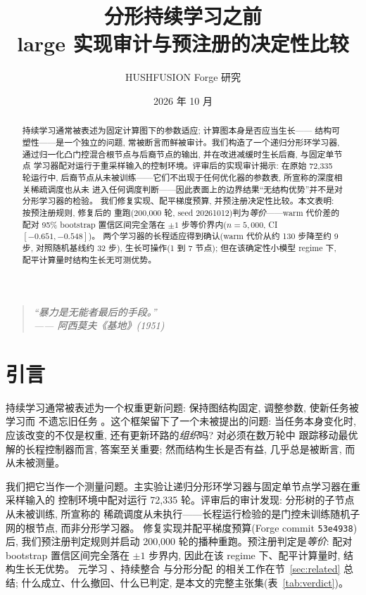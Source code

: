 \documentclass[11pt]{article}
\title{分形持续学习之前\\large 实现审计与预注册的决定性比较}
\author{HUSHFUSION Forge 研究}
\date{2026 年 10 月}
\begin{document}
\maketitle

\begin{quote}
\itshape
``暴力是无能者最后的手段。''
\\
—— 阿西莫夫《基地》(1951)
\end{quote}

\begin{abstract}
持续学习通常被表述为固定计算图下的参数适应; 计算图本身是否应当生长——
结构可塑性——是一个独立的问题, 常被断言而鲜被审计。我们构造了一个递归分形环学习器,
通过归一化凸门控混合根节点与后裔节点的输出, 并在改进减缓时生长后裔, 与固定单节点
学习器配对运行于重采样输入的控制环境。评审后的实现审计揭示: 在原始 72,335 轮运行中,
后裔节点从未被训练——它们不出现于任何优化器的参数表, 所宣称的深度相关稀疏调度也从未
进入任何调度判断——因此表面上的边界结果``无结构优势''并不是对分形学习器的检验。
我们修复实现、配平梯度预算, 并预注册决定性比较。本文表明: 按预注册规则, 修复后的
重跑(200,000 轮, seed 20261012)判为\emph{等价}——warm 代价差的配对 95\% bootstrap
置信区间完全落在 $\pm 1$ 步等价界内($n=5{,}000$, CI $[-0.651,-0.548]$)。
两个学习器的长程适应得到确认(warm 代价从约 130 步降至约 9 步, 对照随机基线约 32 步),
生长可操作(1 到 7 节点); 但在该确定性小模型 regime 下, 配平计算量时结构生长无可测优势。
\end{abstract}

\section{引言}

持续学习通常被表述为一个权重更新问题: 保持图结构固定, 调整参数, 使新任务被学习而
不遗忘旧任务 \cite{Finn2017,Li2017,Kirkpatrick2017}。这个框架留下了一个未被提出的问题:
当任务本身变化时, 应该改变的不仅是权重, 还有更新环路的\emph{组织}吗? 对必须在数万轮中
跟踪移动最优解的长程控制器而言, 答案至关重要; 然而结构生长是否有益, 几乎总是被断言,
而从未被测量。

我们把它当作一个测量问题。主实验让递归分形环学习器与固定单节点学习器在重采样输入的
控制环境中配对运行 72,335 轮。评审后的审计发现: 分形树的子节点从未被训练, 所宣称的
稀疏调度从未执行——长程运行检验的是门控未训练随机子网的根节点, 而非分形学习器。
修复实现并配平梯度预算(Forge commit \texttt{53e4938})后, 我们预注册判定规则并启动
200,000 轮的播种重跑。预注册判定是\emph{等价}: 配对 bootstrap 置信区间完全落在
$\pm 1$ 步界内, 因此在该 regime 下、配平计算量时, 结构生长无优势。
元学习 \cite{Finn2017,Li2017}、持续整合 \cite{Kirkpatrick2017} 与分形分配
\cite{Murray1926,LmPrincipleFractal} 的相关工作在节~\ref{sec:related} 总结;
什么成立、什么撤回、什么已判定, 是本文的完整主张集(表~\ref{tab:verdict})。
\end{document}
